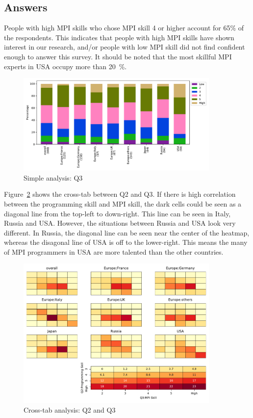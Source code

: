 
\subsection{Answers}


People with high MPI skills who chose MPI skill 4 or higher 
account for 65\% of the respondents. This 
indicates that people with high MPI skills have shown 
interest in our research, and/or people with low MPI skill did not
find confident enough to answer this survey. It should be noted that
the most skillful MPI experts in USA occupy more than 20~\%. 

\begin{figure}[htb]
\begin{center}
\includegraphics[width=10cm]{../pdfs/Q3.pdf}
\caption{Simple analysis: Q3}
\label{fig:Q3}
\end{center}
\end{figure}

Figure~\ref{fig:Q2-Q3X} shows the cross-tab between Q2 and Q3. If there
is high correlation between the programming skill and MPI skill, the
dark cells could be seen as a diagonal line from the top-left to
down-right. This line can be seen in Italy, Russia and USA. However,
the situations between Russia and USA look very different. In Russia,
the diagonal line can be seen near the center of the heatmap, whereas
the disagonal line of USA is off to the lower-right. This means the
many of MPI programmers in USA are more talented than the other
countries. 

\begin{figure}[htb]
\begin{center}
\includegraphics[width=10cm]{../pdfs/Q2-Q3.pdf}
\caption{Cross-tab analysis: Q2 and Q3}
\label{fig:Q2-Q3X}
\end{center}
\end{figure}
